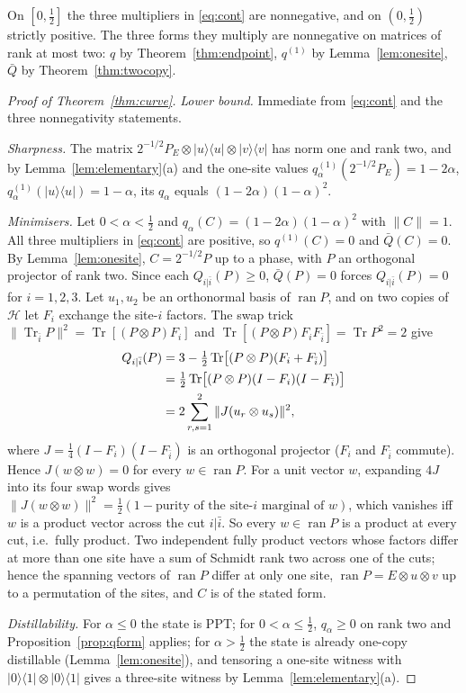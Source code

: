 \documentclass[aps,pra,twocolumn,superscriptaddress,nofootinbib,longbibliography]{revtex4-2}
\newcommand{\Hh}{\mathcal H}
\newcommand{\ket}[1]{|#1\rangle}
\newcommand{\bra}[1]{\langle #1|}
\DeclareMathOperator{\Tr}{Tr}
\DeclareMathOperator{\ran}{ran}
\theoremstyle{plain}
\theoremstyle{definition}
\theoremstyle{remark}
\begin{document}
On $[0,\tfrac12]$ the three multipliers in \eqref{eq:cont} are nonnegative, and on $(0,\tfrac12)$ strictly positive. The three forms they multiply are nonnegative on matrices of rank at most two: $q$ by Theorem~\ref{thm:endpoint}, $q^{(1)}$ by Lemma~\ref{lem:onesite}, $\bar Q$ by Theorem~\ref{thm:twocopy}.

\begin{proof}[Proof of Theorem~\ref{thm:curve}]
\emph{Lower bound.} Immediate from \eqref{eq:cont} and the three nonnegativity statements.

\emph{Sharpness.} The matrix $2^{-1/2}P_E\otimes\ket u\bra u\otimes\ket v\bra v$ has norm one and rank two, and by Lemma~\ref{lem:elementary}(a) and the one-site values $q^{(1)}_\alpha(2^{-1/2}P_E)=1-2\alpha$, $q^{(1)}_\alpha(\ket u\bra u)=1-\alpha$, its $q_\alpha$ equals $(1-2\alpha)(1-\alpha)^2$.

\emph{Minimisers.} Let $0<\alpha<\tfrac12$ and $q_\alpha(C)=(1-2\alpha)(1-\alpha)^2$ with $\|C\|=1$. All three multipliers in \eqref{eq:cont} are positive, so $q^{(1)}(C)=0$ and $\bar Q(C)=0$. By Lemma~\ref{lem:onesite}, $C=2^{-1/2}P$ up to a phase, with $P$ an orthogonal projector of rank two. Since each $Q_{i|\bar i}(P)\ge0$, $\bar Q(P)=0$ forces $Q_{i|\bar i}(P)=0$ for $i=1,2,3$. Let $u_1,u_2$ be an orthonormal basis of $\ran P$, and on two copies of $\Hh$ let $F_i$ exchange the site-$i$ factors. The swap trick $\|\Tr_{\bar i}P\|^2=\Tr[(P\otimes P)F_i]$ and $\Tr[(P\otimes P)F_iF_{\bar i}]=\Tr P^2=2$ give
\begin{align}
Q_{i|\bar i}(P)&=3-\tfrac12\Tr\bigl[(P\otimes P)(F_i+F_{\bar i})\bigr]\notag\\
&=\tfrac12\Tr\bigl[(P\otimes P)(I-F_i)(I-F_{\bar i})\bigr]\notag\\
&=2\sum_{r,s=1}^2\|J(u_r\otimes u_s)\|^2 ,\label{eq:QP}
\end{align}
where $J=\tfrac14(I-F_i)(I-F_{\bar i})$ is an orthogonal projector ($F_i$ and $F_{\bar i}$ commute). Hence $J(w\otimes w)=0$ for every $w\in\ran P$. For a unit vector $w$, expanding $4J$ into its four swap words gives $\|J(w\otimes w)\|^2=\tfrac12(1-\text{purity of the site-$i$ marginal of }w)$, which vanishes iff $w$ is a product vector across the cut $i|\bar i$. So every $w\in\ran P$ is a product at every cut, i.e.\ fully product. Two independent fully product vectors whose factors differ at more than one site have a sum of Schmidt rank two across one of the cuts; hence the spanning vectors of $\ran P$ differ at only one site, $\ran P=E\otimes u\otimes v$ up to a permutation of the sites, and $C$ is of the stated form.

\emph{Distillability.} For $\alpha\le0$ the state is PPT; for $0<\alpha\le\tfrac12$, $q_\alpha\ge0$ on rank two and Proposition~\ref{prop:qform} applies; for $\alpha>\tfrac12$ the state is already one-copy distillable (Lemma~\ref{lem:onesite}), and tensoring a one-site witness with $\ket0\bra1\otimes\ket0\bra1$ gives a three-site witness by Lemma~\ref{lem:elementary}(a).
\end{proof}
\end{document}
